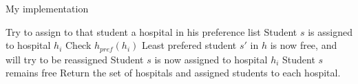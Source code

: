 \documentclass{article}
\begin{document}
\begin{algorithm}
\caption{My implementation}
\begin{algorithmic}[1]
 \State Try to assign to that student a hospital in his preference list
  \State Student $s$ is assigned to hospital $h_i$
   \State Check $h_{pref} (h_i)$
   \State Least prefered student $s'$ in $h$ is now free, and will try to be reassigned
   \State Student $s$ is now assigned to hospital $h_i$
   \State Student $s$ remains free
  \EndIf
 \EndIf
\EndWhile
\State Return the set of hospitals and assigned students to each hospital.  
\end{algorithmic}
\end{algorithm}
\end{document}
